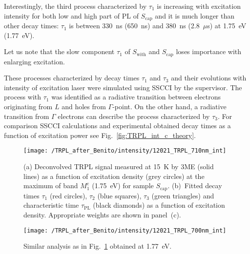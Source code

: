 


Interestingly, the third process characterized by $\tau_1$ is increasing with excitation intensity for both low and high part of PL of $S_\mathrm{cap}$ and it is much longer than other decay times: $\tau_1$ is between 330~ns (650~ns) and 380~ns (2.8~$\mu$s) at 1.75~eV (1.77~eV). 


Let us note that the slow component $\tau_1$ of $S_\mathrm{with}$ and $S_\mathrm{cap}$ loses importance with enlarging excitation.


These processes characterized by decay times $\tau_1$ and $\tau_3$ and their evolutions with intensity of excitation laser were simulated using SSCCI by the supervisor. The process with $\tau_1$ was identified as a radiative transition between electrons originating from $L$ and holes from $\Gamma$-point. On the other hand, a radiative transition from $\Gamma$ electrons can describe the process characterized by $\tau_3$. For comparison SSCCI calculations and experimental obtained decay times as a function of excitation power see Fig.~\ref{fig:TRPL_int_c_theory}.


\begin{figure}
	\centering
	\texttt{[image: /TRPL\_after\_Benito/intensity/12021\_TRPL\_710nm\_int]}
	\caption{(a) Deconvolved TRPL signal measured at 15~K by 3ME (solid lines) as a function of excitation density (grey circles) at the maximum of band $M_1^\mathrm{c}$ (1.75~eV) for sample $S_\mathrm{cap}$. (b)~Fitted decay times $\tau_1$ (red circles), $\tau_2$ (blue squares), $\tau_3$ (green triangles) and characteristic time $\tau_\mathrm{PL}$ (black diamonds) as a function of excitation density. Appropriate weights are shown in panel~(c).}
	\label{fig:TRPL_int_c}
\end{figure}
%
\begin{figure}
	\centering
	\texttt{[image: /TRPL\_after\_Benito/intensity/12021\_TRPL\_700nm\_int]}
	\caption{Similar analysis as in Fig.~\ref{fig:TRPL_int_c} obtained at 1.77~eV.}
	\label{fig:TRPL_int_c_L}
\end{figure}

